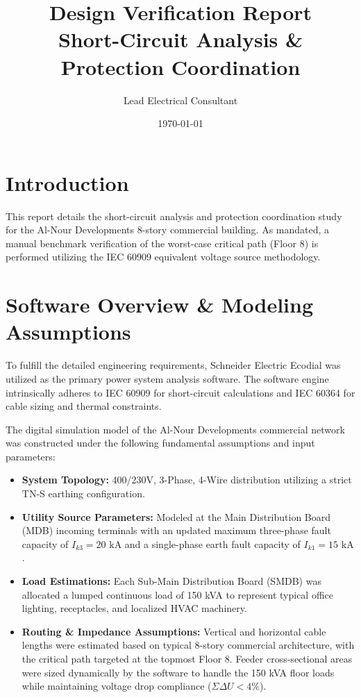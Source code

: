 \documentclass[11pt, a4paper]{article}
\title{Design Verification Report \\ 
\large Short-Circuit Analysis \& Protection Coordination}
\author{Lead Electrical Consultant}
\date{\today}
\begin{document}
\maketitle

\section{Introduction}
This report details the short-circuit analysis and protection coordination study for the Al-Nour Developments 8-story commercial building. As mandated, a manual benchmark verification of the worst-case critical path (Floor 8) is performed utilizing the IEC 60909 equivalent voltage source methodology.
\section{Software Overview \& Modeling Assumptions}
To fulfill the detailed engineering requirements, Schneider Electric Ecodial was utilized as the primary power system analysis software. The software engine intrinsically adheres to IEC 60909 for short-circuit calculations and IEC 60364 for cable sizing and thermal constraints.

The digital simulation model of the Al-Nour Developments commercial network was constructed under the following fundamental assumptions and input parameters:
\begin{itemize}
    \item \textbf{System Topology:} 400/230V, 3-Phase, 4-Wire distribution utilizing a strict TN-S earthing configuration.
    \item \textbf{Utility Source Parameters:} Modeled at the Main Distribution Board (MDB) incoming terminals with an updated maximum three-phase fault capacity of $I_{k3} = 20 \text{ kA}$ and a single-phase earth fault capacity of $I_{k1} = 15 \text{ kA}$.
    \item \textbf{Load Estimations:} Each Sub-Main Distribution Board (SMDB) was allocated a lumped continuous load of 150 kVA to represent typical office lighting, receptacles, and localized HVAC machinery.
    \item \textbf{Routing \& Impedance Assumptions:} Vertical and horizontal cable lengths were estimated based on typical 8-story commercial architecture, with the critical path targeted at the topmost Floor 8. Feeder cross-sectional areas were sized dynamically by the software to handle the 150 kVA floor loads while maintaining voltage drop compliance ($\Sigma \Delta U < 4\%$).
\end{itemize}
\end{document}
